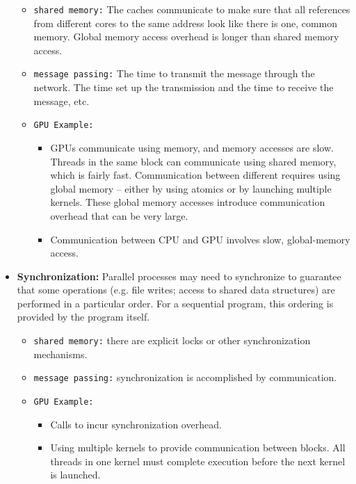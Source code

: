 \documentclass[../main.tex]{subfiles}
\begin{document}
\begin{itemize}
	      \begin{itemize}
		      \item \texttt{shared memory:} The caches communicate to make sure that all references from different cores to the same address look like there is one, common memory. Global memory access overhead is longer than shared memory access.
		      \item \texttt{message passing:} The time to transmit the message through the network. The time set up the transmission and the time to receive the message, etc.
		      \item {
		            \texttt{GPU Example:}
		            \begin{itemize}
			            \item GPUs communicate using memory, and memory accesses are slow. Threads in the same block can communicate using shared memory, which is fairly fast. Communication between different requires using global memory -- either by using atomics or by launching multiple kernels. These global memory accesses introduce communication overhead that can be very large.
			            \item Communication between CPU and GPU involves slow, global-memory access.
		            \end{itemize}
		            }
	      \end{itemize}
	\item \textbf{Synchronization:} Parallel processes may need to synchronize to guarantee that some operations (e.g. file writes; access to shared data structures) are performed in a particular order. For a sequential program, this ordering is provided by the program itself.
	      \begin{itemize}
		      \item \texttt{shared memory:} there are explicit locks or other synchronization mechanisms.
		      \item \texttt{message passing:} synchronization is accomplished by communication.
		      \item {
		            \texttt{GPU Example:}
		            \begin{itemize}
			            \item Calls to  incur synchronization overhead.
			            \item Using multiple kernels to provide communication between blocks. All threads in one kernel must complete execution before the next kernel is launched.
		            \end{itemize}
}
\end{itemize}
\end{itemize}
\end{document}
